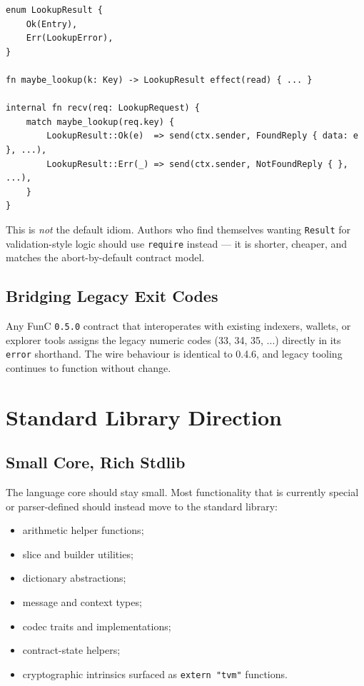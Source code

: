 \documentclass[12pt,oneside]{article}
\begin{document}
\begin{verbatim}
enum LookupResult {
    Ok(Entry),
    Err(LookupError),
}

fn maybe_lookup(k: Key) -> LookupResult effect(read) { ... }

internal fn recv(req: LookupRequest) {
    match maybe_lookup(req.key) {
        LookupResult::Ok(e)  => send(ctx.sender, FoundReply { data: e }, ...),
        LookupResult::Err(_) => send(ctx.sender, NotFoundReply { },     ...),
    }
}
\end{verbatim}

This is \emph{not} the default idiom. Authors who find themselves
wanting \verb|Result| for validation-style logic should use
\verb|require| instead --- it is shorter, cheaper, and matches the
abort-by-default contract model.

\subsection{Bridging Legacy Exit Codes}
Any FunC \verb|0.5.0| contract that interoperates with existing
indexers, wallets, or explorer tools assigns the legacy numeric codes
(33, 34, 35, ...) directly in its \verb|error| shorthand. The wire
behaviour is identical to 0.4.6, and legacy tooling continues to
function without change.

\section{Standard Library Direction}
\subsection{Small Core, Rich Stdlib}
The language core should stay small. Most functionality that is currently
special or parser-defined should instead move to the standard library:

\begin{itemize}
\item arithmetic helper functions;
\item slice and builder utilities;
\item dictionary abstractions;
\item message and context types;
\item codec traits and implementations;
\item contract-state helpers;
\item cryptographic intrinsics surfaced as \verb|extern "tvm"| functions.
\end{itemize}
\end{document}
